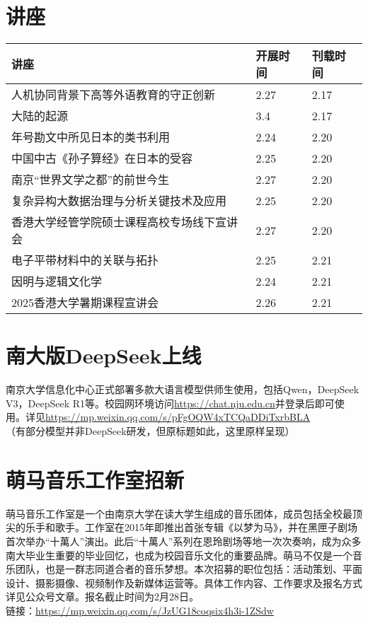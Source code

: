 \documentclass[letterpaper, 12pt]{article}
\begin{document}
\begin{multicols}{2}

\section{讲座}
\begin{tabular}{|>{\centering\arraybackslash}m{}|m{}|m{}|}
    \hline
    讲座 & 开展时间 & 刊载时间\\
    \hline\hline
    人机协同背景下高等外语教育的守正创新 & 2.27 & 2.17\\\hline
    大陆的起源 & 3.4 & 2.17\\\hline
    年号勘文中所见日本的类书利用 & 2.24 & 2.20\\\hline
    中国中古《孙子算经》在日本的受容 & 2.25 & 2.20\\\hline
    南京“世界文学之都”的前世今生 & 2.27 & 2.20\\\hline
    复杂异构大数据治理与分析关键技术及应用 & 2.25 & 2.20\\\hline
    香港大学经管学院硕士课程高校专场线下宣讲会 & 2.27 & 2.20\\\hline
    电子平带材料中的关联与拓扑 & 2.25 & 2.21\\\hline
    因明与逻辑文化学 & 2.24 & 2.21\\\hline
    2025香港大学暑期课程宣讲会 & 2.26 & 2.21\\\hline
\end{tabular}


\section{南大版DeepSeek上线}
南京大学信息化中心正式部署多款大语言模型供师生使用，包括Qwen，DeepSeek V3，DeepSeek R1等。校园网环境访问\url{https://chat.nju.edu.cn}并登录后即可使用。详见\url{https://mp.weixin.qq.com/s/pFgOQW4xTCQaDDiTxrbBLA}\\（有部分模型并非DeepSeek研发，但原标题如此，这里原样呈现）

\section{ 萌马音乐工作室招新}
萌马音乐工作室是一个由南京大学在读大学生组成的音乐团体，成员包括全校最顶尖的乐手和歌手。工作室在2015年即推出首张专辑《以梦为马》，并在黑匣子剧场首次举办“十萬人”演出。此后“十萬人”系列在恩玲剧场等地一次次奏响，成为众多南大毕业生重要的毕业回忆，也成为校园音乐文化的重要品牌。萌马不仅是一个音乐团队，也是一群志同道合者的音乐梦想。本次招募的职位包括：活动策划、平面设计、摄影摄像、视频制作及新媒体运营等。具体工作内容、工作要求及报名方式详见公众号文章。报名截止时间为2月28日。\\
链接：\url{https://mp.weixin.qq.com/s/JzUG18coqsix4h3i-1ZSdw}\\


\end{multicols}
\end{document}
